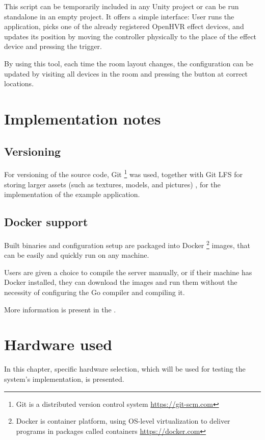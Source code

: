 This script can be temporarily included in any Unity project or can be run
standalone in an empty project. It offers a simple interface:
User runs the application, picks one of the already registered OpenHVR
effect devices, and updates its position by moving the controller physically
to the place of the effect device and pressing the trigger.


By using this tool, each time the room layout changes, the configuration can
be updated by visiting all devices in the room and pressing the button at
correct locations.


\hypertarget{x-implementation-notes}{\section{Implementation notes}}
\hypertarget{x-versioning}{\subsection{Versioning}}
For versioning of the source code, Git
\footnote{Git is a distributed version control system \href{https://git-scm.com}{https://git-scm.com}}
was used, together with Git LFS for
storing larger assets (such as textures, models, and pictures)
, for the implementation of the example application.


\hypertarget{x-docker-support}{\subsection{Docker support}}
Built binaries and configuration setup are packaged into Docker
\footnote{Docker is container platform, using OS-level virtualization to deliver programs in packages called containers \href{https://docker.com}{https://docker.com}}
images, that can be easily and quickly run on any machine.


Users are given a choice to compile the server manually, or if their machine has
Docker installed, they can download the images and run them without
the necessity of configuring the Go compiler and compiling it.


More information is present in the \hyperlink{13-install-guide}{}.


\hypertarget{x-hardware-used}{\section{Hardware used}}
In this chapter, specific hardware selection, which will be used for testing the
system’s implementation, is presented.


